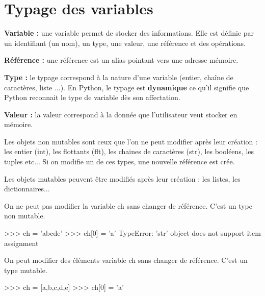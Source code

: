 \documentclass[10pt]{article}
\begin{document}
\setlength{\parskip}{1ex plus 0.2ex minus 0.2ex}



\section{Typage des variables}
\begin{defi}
\textbf{Variable :} une variable permet de stocker des informations. Elle est définie par un identifiant (un nom), un type, une valeur, une référence et des opérations.

\textbf{Référence :} une référence est un alias pointant vers une adresse mémoire.

\textbf{Type :} le typage correspond à la nature d'une variable (entier, chaîne de caractères, liste ...). En Python, le typage est \textbf{dynamique} ce qu'il signifie que Python reconnait le type de variable dès son affectation.

\textbf{Valeur : } la valeur correspond à la donnée que l'utilisateur veut stocker en mémoire. 
\end{defi}

\begin{exemple}
Les objets non mutables sont ceux que l'on ne peut modifier après leur création : les entier (int), les flottants (flt), les chaines de caractères (str), les booléens, les tuples etc... Si on modifie un de ces types, une nouvelle référence est crée.

Les objets mutables peuvent être modifiés après leur création : les listes, les dictionnaires...

\begin{py}
\begin{minipage}[t]{.47\linewidth}
On ne peut pas modifier la variable \textsf{ch} sans changer de référence. C'est un type non mutable.
\begin{python}
>>> ch = 'abcde'
>>> ch[0] = 'a'
            TypeError: 'str' object does not 
            support item assignment
\end{python}
\end{minipage} \hfill
\begin{minipage}[t]{.47\linewidth}
On peut modifier des éléments variable \textsf{ch} sans changer de référence. C'est un type mutable.
\begin{python}
>>> ch = [a,b,c,d,e]
>>> ch[0] = 'a'
\end{python}
\end{minipage}
\end{py}
\end{exemple}
\end{document}
